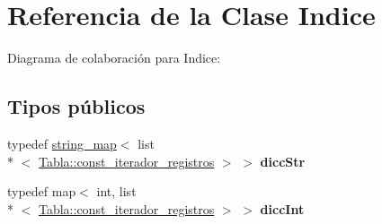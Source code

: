 \hypertarget{classIndice}{\section{Referencia de la Clase Indice}
\label{classIndice}
}


Diagrama de colaboración para Indice\+:
\subsection*{Tipos públicos}
\begin{DoxyCompactItemize}
\item 
\hypertarget{classIndice_a9622995a225ae635737eb60ac328881c}{typedef \hyperlink{classstring__map}{string\+\_\+map}$<$ list\\*
$<$ \hyperlink{classTabla_1_1const__iterador__registros}{Tabla\+::const\+\_\+iterador\+\_\+registros} $>$ $>$ {\bfseries dicc\+Str}}\label{classIndice_a9622995a225ae635737eb60ac328881c}

\item 
\hypertarget{classIndice_a38781c181ea949ef7d0034d37c19a622}{typedef map$<$ int, list\\*
$<$ \hyperlink{classTabla_1_1const__iterador__registros}{Tabla\+::const\+\_\+iterador\+\_\+registros} $>$ $>$ {\bfseries dicc\+Int}}\label{classIndice_a38781c181ea949ef7d0034d37c19a622}

\end{DoxyCompactItemize}

